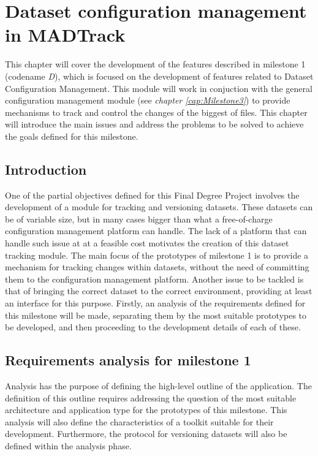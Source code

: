 \chapter{Dataset configuration management in MADTrack}\label{cap:Milestone1}

This chapter will cover the development of the features described in milestone 1 (codename \emph{D}), which is focused on the development of features related to Dataset
Configuration Management. This module will work in conjuction with the general configuration management module (see \emph{chapter \ref{cap:Milestone3}}) to provide mechanisms
to track and control the changes of the biggest of files. This chapter will introduce the main issues and address the problems to be solved to achieve the goals defined for this
milestone.

\section{Introduction}

One of the partial objectives defined for this Final Degree Project involves the development of a module for tracking and versioning datasets. These datasets can be of variable
size, but in many cases bigger than what a free-of-charge configuration management platform can handle. The lack of a platform that can handle such issue at
at a feasible cost motivates the creation of this dataset tracking module. The main focus of the prototypes of milestone 1 is to provide a mechanism for tracking changes within
datasets, without the need of committing them to the configuration management platform. Another issue to be tackled is that of bringing the correct dataset to the correct environment,
providing at least an interface for this purpose. Firstly, an analysis of the requirements defined for this milestone will be made, separating them by the most suitable
prototypes to be developed, and then proceeding to the development details of each of these.

\section{Requirements analysis for milestone 1}

Analysis has the purpose of defining the high-level outline of the application. The definition of this outline requires addressing the question of the most suitable architecture and
application type for the prototypes of this milestone. This analysis will also define the characteristics of a toolkit suitable for their development. Furthermore, the
protocol for versioning datasets will also be defined within the analysis phase.

